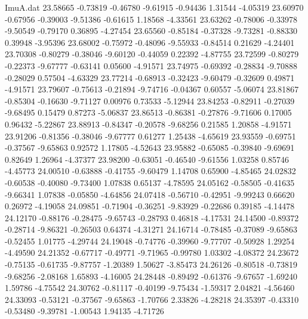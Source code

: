 \begin{filecontents}{ImuA.dat}
  23.58665   -0.73819   -0.46780   -9.61915   -0.94436    1.31544   -4.05319
  23.60970   -0.67956   -0.39003   -9.51386   -0.61615    1.18568   -4.33561
  23.63262   -0.78006   -0.33978   -9.50549   -0.79170    0.36895   -4.27454
  23.65560   -0.85184   -0.37328   -9.73281   -0.88330    0.39948   -3.95396
  23.68002   -0.75972   -0.48096   -9.55933   -0.84514    0.21629   -4.24401
  23.70308   -0.80279   -0.38046   -9.60120   -0.44059    0.22392   -4.87755
  23.72599   -0.80279   -0.22373   -9.67777   -0.63141    0.05600   -4.91571
  23.74975   -0.69392   -0.28834   -9.70888   -0.28029    0.57504   -4.63329
  23.77214   -0.68913   -0.32423   -9.60479   -0.32609    0.49871   -4.91571
  23.79607   -0.75613   -0.21894   -9.74716   -0.04367    0.60557   -5.06074
  23.81867   -0.85304   -0.16630   -9.71127    0.00976    0.73533   -5.12944
  23.84253   -0.82911   -0.27039   -9.68495    0.15479    0.87273   -5.06837
  23.86513   -0.86381   -0.27876   -9.71606    0.17005    0.96432   -5.22867
  23.88913   -0.84347   -0.20578   -9.68256    0.21585    1.20858   -4.91571
  23.91206   -0.81356   -0.38046   -9.67777    0.61277    1.25438   -4.65619
  23.93559   -0.69751   -0.37567   -9.65863    0.92572    1.17805   -4.52643
  23.95882   -0.65085   -0.39840   -9.69691    0.82649    1.26964   -4.37377
  23.98200   -0.63051   -0.46540   -9.61556    1.03258    0.85746   -4.45773
  24.00510   -0.63888   -0.41755   -9.60479    1.14708    0.65900   -4.85465
  24.02832   -0.60538   -0.40080   -9.73400    1.07838    0.65137   -4.78595
  24.05162   -0.58505   -0.41635   -9.66341    1.07838   -0.05850   -4.64856
  24.07418   -0.56710   -0.42951   -9.99243    0.66620    0.26972   -4.19058
  24.09851   -0.71904   -0.36251   -9.83929   -0.22686    0.39185   -4.14478
  24.12170   -0.88176   -0.28475   -9.65743   -0.28793    0.46818   -4.17531
  24.14500   -0.89372   -0.28714   -9.86321   -0.26503    0.64374   -4.31271
  24.16714   -0.78485   -0.37089   -9.65863   -0.52455    1.01775   -4.29744
  24.19048   -0.74776   -0.39960   -9.77707   -0.50928    1.29254   -4.49590
  24.21352   -0.67717   -0.49771   -9.71965   -0.99780    1.03302   -4.08372
  24.23672   -0.75135   -0.61735   -9.87757   -1.20389    1.50627   -3.85473
  24.26126   -0.80518   -0.73819   -9.68256   -2.08168    1.65893   -4.16005
  24.28448   -0.89492   -0.61376   -9.67657   -1.69240    1.59786   -4.75542
  24.30762   -0.81117   -0.40199   -9.75434   -1.59317    2.04821   -4.56460
  24.33093   -0.53121   -0.37567   -9.65863   -1.70766    2.33826   -4.28218
  24.35397   -0.43310   -0.53480   -9.39781   -1.00543    1.94135   -4.71726

\end{filecontents}
